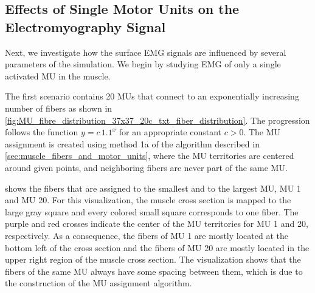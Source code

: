 \subsection{Effects of Single Motor Units on the Electromyography Signal}\label{sec:simfiber_mu}

Next, we investigate how the surface EMG signals are influenced by several parameters of the simulation. We begin by studying EMG of only a single activated MU in the muscle.

The first scenario contains 20 MUs that connect to an exponentially increasing number of fibers as shown in \cref{fig:MU_fibre_distribution_37x37_20c_txt_fiber_distribution}. The progression follows the function $y=c\,1.1^x$ for an appropriate constant $c>0$.
The MU assignment is created using method 1a of the algorithm described in \cref{sec:muscle_fibers_and_motor_units}, where the MU territories are centered around given points, and neighboring fibers are never part of the same MU. 

 shows the fibers that are assigned to the smallest and to the largest MU, MU 1 and MU 20. For this visualization, the muscle cross section is mapped to the large gray square and every colored small square corresponds to one fiber. The purple and red crosses indicate the center of the MU territories for MU 1 and 20, respectively. As a consequence, the fibers of MU 1 are mostly located at the bottom left of the cross section and the fibers of MU 20 are mostly located in the upper right region of the muscle cross section.
The visualization shows that the fibers of the same MU always have some spacing between them, which is due to the construction of the MU assignment algorithm.
\newpage

